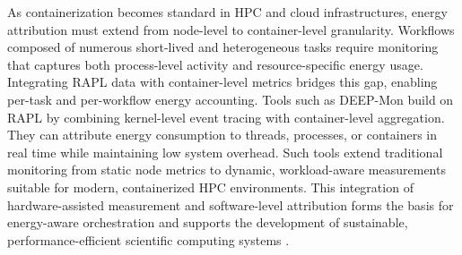 As containerization becomes standard in HPC and cloud infrastructures, energy attribution must extend from node-level to container-level granularity. Workflows composed of numerous short-lived and heterogeneous tasks require monitoring that captures both process-level activity and resource-specific energy usage. Integrating RAPL data with container-level metrics bridges this gap, enabling per-task and per-workflow energy accounting.
Tools such as DEEP-Mon build on RAPL by combining kernel-level event tracing with container-level aggregation. They can attribute energy consumption to threads, processes, or containers in real time while maintaining low system overhead. Such tools extend traditional monitoring from static node metrics to dynamic, workload-aware measurements suitable for modern, containerized HPC environments. This integration of hardware-assisted measurement and software-level attribution forms the basis for energy-aware orchestration and supports the development of sustainable, performance-efficient scientific computing systems \cite{8425477}.

